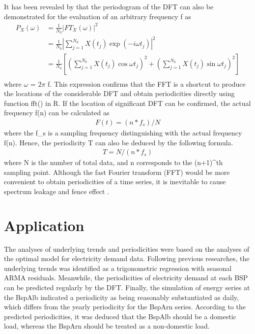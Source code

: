\documentclass[12pt,msc]{uom_eee_dissertation_casson}
\begin{document}
It has been revealed by \citet{scargle1982studies} that the periodogram of the DFT can also be demonstrated for the evaluation of an arbitrary frequency f as
\begin{equation}
\label{eq:1-11}
\begin{aligned}
P_{X}(\omega)&=\frac{1}{N_{0}}|FT_{X}( \omega )|^{2}\\
&=\frac{1}{N_{0}}|\sum_{j=1}^{N_{0}}X(t_{j})\exp(-i\omega t_{j})|^{2}\\
&=\frac{1}{N_{0}}[(\sum_{j=1}^{N_{0}}X(t_{j})\cos\omega t_{j})^{2} + (\sum_{j=1}^{N_{0}}X(t_{j})\sin\omega t_{j})^{2}]\\
\end{aligned}
\end{equation}
where $\omega$ = $2\pi$ f. This expression confirms that the FFT is a shortcut to produce the locations of the considerable DFT and obtain periodicities directly using function fft() in R. If the location of significant DFT can be confirmed, the actual frequency f(n) can be calculated as
\begin{equation}
\label{eq:1-12}
\begin{aligned}
F(t)=(n*f_{s})/N
\end{aligned}
\end{equation}
where the f_{s} is a sampling frequency distinguishing with the actual frequency f(n). Hence, the periodicity T can also be deduced by the following formula.
\begin{equation}
\label{eq:1-13}
\begin{aligned}
T=N/(n*f_{s})
\end{aligned}
\end{equation}
where N is the number of total data, and n corresponds to the (n+1)^{th} sampling point. Although the fast Fourier transform (FFT) would be more convenient to obtain periodicities of a time series, it is inevitable to cause spectrum leakage and fence effect \citep{reddy1996fft}. 

\section{Application}  %
\label{sec:application}
The analyses of underlying trends and periodicities were based on the analyses of the optimal model for electricity demand data. Following previous researches, the underlying trends was identified as a trigonometric regression with seasonal ARMA residuals. Meanwhile, the periodicities of electricity demand at each BSP can be predicted regularly by the DFT. Finally, the simulation of energy series at the BspAlb indicated a periodicity as being reasonably substantiated as daily, which differs from the yearly periodicity for the BspArn series. According to the predicted periodicities, it was deduced that the BspAlb should be a domestic load, whereas the BspArn should be treated as a non-domestic load.
\end{document}
